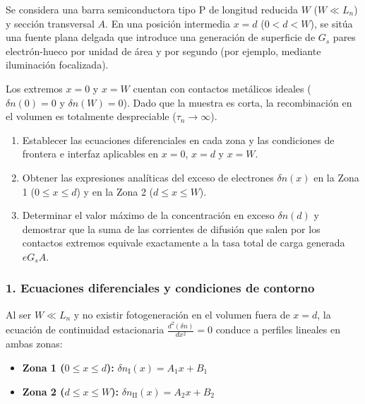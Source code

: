 \begin{problema}
Se considera una barra semiconductora tipo P de longitud reducida $W$ ($W \ll L_n$) y sección transversal $A$. En una posición intermedia $x = d$ ($0 < d < W$), se sitúa una fuente plana delgada que introduce una generación de superficie de $G_s$ pares electrón-hueco por unidad de área y por segundo (por ejemplo, mediante iluminación focalizada).

Los extremos $x = 0$ y $x = W$ cuentan con contactos metálicos ideales ($\delta n(0) = 0$ y $\delta n(W) = 0$). Dado que la muestra es corta, la recombinación en el volumen es totalmente despreciable ($\tau_n \to \infty$).

\begin{enumerate}[label=\alph*)]
    \item Establecer las ecuaciones diferenciales en cada zona y las condiciones de frontera e interfaz aplicables en $x = 0$, $x = d$ y $x = W$.
    \item Obtener las expresiones analíticas del exceso de electrones $\delta n(x)$ en la Zona 1 ($0 \le x \le d$) y en la Zona 2 ($d \le x \le W$).
    \item Determinar el valor máximo de la concentración en exceso $\delta n(d)$ y demostrar que la suma de las corrientes de difusión que salen por los contactos extremos equivale exactamente a la tasa total de carga generada $e G_s A$.
\end{enumerate}

\tcblower
\subsubsection*{1. Ecuaciones diferenciales y condiciones de contorno}
Al ser $W \ll L_n$ y no existir fotogeneración en el volumen fuera de $x = d$, la ecuación de continuidad estacionaria $\frac{d^2(\delta n)}{dx^2} = 0$ conduce a perfiles lineales en ambas zonas:
\begin{itemize}
    \item \textbf{Zona 1 ($0 \le x \le d$):} $\delta n_{\text{I}}(x) = A_1 x + B_1$
    \item \textbf{Zona 2 ($d \le x \le W$):} $\delta n_{\text{II}}(x) = A_2 x + B_2$
\end{itemize}


\end{problema}
